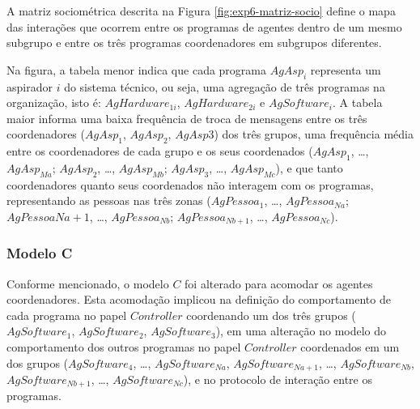 A matriz sociométrica descrita na Figura \ref{fig:exp6-matriz-socio} define o mapa das interações que ocorrem entre os programas de agentes dentro de um mesmo subgrupo e entre os três programas coordenadores em subgrupos diferentes. 


\begin{figure}[h!]
    \centering
\end{figure}

Na figura, a tabela menor indica que cada programa $AgAsp_i$ representa um aspirador $i$ do sistema técnico, ou seja, uma agregação de três programas na organização, isto é: $AgHardware_{1i}$, $AgHardware_{2i}$ e $AgSoftware_i$. A tabela maior informa uma baixa frequência de troca de mensagens entre os três coordenadores ($AgAsp_1$, $AgAsp_2$, $AgAsp3$) dos três grupos, uma frequência média entre os coordenadores de cada grupo e os seus coordenados ($AgAsp_1$, \ldots, $AgAsp_{Ma}$; $AgAsp_2$,  \ldots, $AgAsp_{Mb}$; $AgAsp_3$, \ldots, $AgAsp_{Mc}$), e que tanto coordenadores quanto seus coordenados não interagem com os programas, representando as pessoas nas três zonas ($AgPessoa_1$, \ldots, $AgPessoa_{Na}$; $AgPessoa{Na+1}$, \ldots, $AgPessoa_{Nb}$; $AgPessoa_{Nb+1}$, \ldots, $AgPessoa_{Nc}$).

\subsubsection{Modelo C}

Conforme mencionado, o modelo $C$ foi alterado para acomodar os agentes coordenadores. Esta acomodação implicou na definição do comportamento de cada programa no papel $Controller$ coordenando um dos três grupos ($AgSoftware_1$, $AgSoftware_2$, $AgSoftware_3$), em uma alteração no modelo do comportamento dos outros programas no papel $Controller$ coordenados em um dos grupos ($AgSoftware_4$, \ldots, $AgSoftware_{Na}$, $AgSoftware_{Na+1}$, \ldots, $AgSoftware_{Nb}$, $AgSoftware_{Nb+1}$, \ldots, $AgSoftware_{Nc}$), e no protocolo de interação entre os programas.

